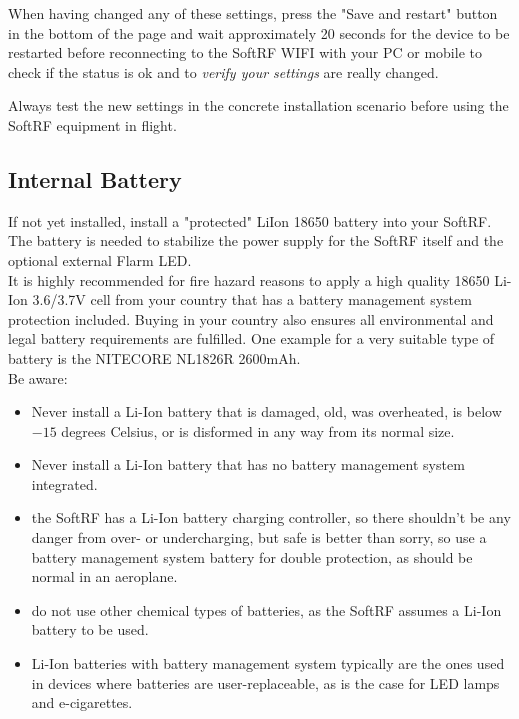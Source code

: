 \documentclass[11pt,a4paper]{article}
\begin{document}
When having changed any of these settings, press the "Save and restart" button in the bottom of the page and wait approximately 20 seconds for the device to be restarted before reconnecting to the SoftRF WIFI with your PC or mobile to check if the status is ok and to {\em verify your settings} are really changed.

Always test the new settings in the concrete installation scenario before using the SoftRF equipment in flight.

\subsection{Internal Battery}\label{battery}
If not yet installed, install a "protected" LiIon 18650 battery into your SoftRF. The battery is needed to stabilize the power supply for the SoftRF itself and the optional external Flarm LED.\\

It is highly recommended for fire hazard reasons to apply a high quality 18650 Li-Ion 3.6/3.7V cell from your country that has a battery management system protection included. Buying in your country also ensures all environmental and legal battery requirements are fulfilled. One example for a very suitable type of battery is the NITECORE NL1826R 2600mAh.\\

Be aware:

\begin{itemize}
\item Never install a Li-Ion battery that is damaged, old, was overheated, is below $-15$ degrees Celsius, or is disformed in any way from its normal size.
\item Never install a Li-Ion battery that has no battery management system integrated.
\item the SoftRF has a Li-Ion battery charging controller, so there shouldn't be any danger from over- or undercharging, but safe is better than sorry, so use a battery management system battery for double protection, as should be normal in an aeroplane.
\item do not use other chemical types of batteries, as the SoftRF assumes a Li-Ion battery to be used.
\item Li-Ion batteries with battery management system typically are the ones used in devices where batteries are user-replaceable, as is the case for LED lamps and e-cigarettes.
\end{itemize}
\end{document}
